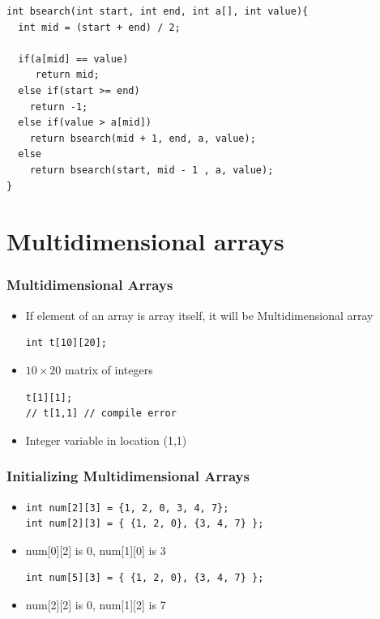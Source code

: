 \documentclass{../c-lecture}
\begin{document}
\begin{frame}[fragile]
  \scriptsize
  \begin{verbatim}
int bsearch(int start, int end, int a[], int value){
  int mid = (start + end) / 2;

  if(a[mid] == value)
     return mid;
  else if(start >= end)
    return -1;
  else if(value > a[mid])
    return bsearch(mid + 1, end, a, value);
  else
    return bsearch(start, mid - 1 , a, value);
}
  \end{verbatim}
\end{frame}

\section{Multidimensional arrays}

\begin{frame}[fragile]
  \frametitle{Multidimensional Arrays}
  \begin{itemize}
    \item
      If element of an array is array itself, it will be Multidimensional array

    \begin{verbatim}
int t[10][20];
    \end{verbatim}
    \item $10 \times 20$ matrix of integers
    \begin{verbatim}
t[1][1];
// t[1,1] // compile error
    \end{verbatim}
    \item Integer variable in location (1,1)
  \end{itemize}
\end{frame}

\begin{frame}[fragile]
  \frametitle{Initializing Multidimensional Arrays}
  \begin{itemize}
    \item[]
    \begin{verbatim}
int num[2][3] = {1, 2, 0, 3, 4, 7};
int num[2][3] = { {1, 2, 0}, {3, 4, 7} };
    \end{verbatim}
    \item num[0][2] is 0, num[1][0] is 3
    \begin{verbatim}
int num[5][3] = { {1, 2, 0}, {3, 4, 7} };
    \end{verbatim}
    \item num[2][2] is 0, num[1][2] is 7
  \end{itemize}
\end{frame}
\end{document}
